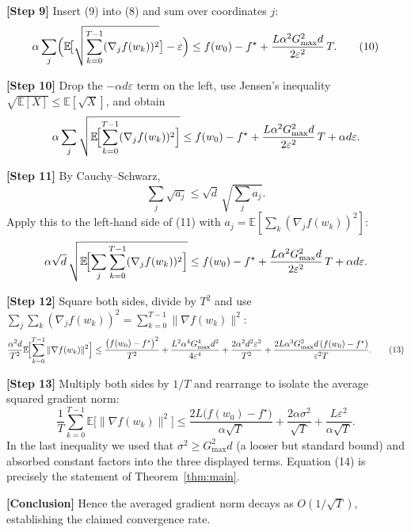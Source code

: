 \documentclass{article}
\newcommand{\E}{\mathbb{E}}
\begin{document}
\noindent\textbf{[Step 9]} Insert (9) into (8) and sum over coordinates $j$:
\[
\alpha\sum_{j}\Bigl(
      \E\!\bigl[\sqrt{\sum_{k=0}^{T-1}(\nabla_{j}f(w_{k}))^{2}}\bigr]
      -\varepsilon\Bigr)
\le f(w_{0})-f^{\star}
   +\frac{L\alpha^{2}G_{\max}^{2}d}{2\varepsilon^{2}}\,T .                         \tag{10}
\]

\noindent\textbf{[Step 10]} Drop the $-\alpha d\varepsilon$ term on the left,
use Jensen’s inequality
$\sqrt{\E[X]}\le\E[\sqrt{X}]$, and obtain
\[
\alpha\sum_{j}\sqrt{\E\!\Bigl[\sum_{k=0}^{T-1}(\nabla_{j}f(w_{k}))^{2}\Bigr]}
\le f(w_{0})-f^{\star}
   +\frac{L\alpha^{2}G_{\max}^{2}d}{2\varepsilon^{2}}\,T +\alpha d\varepsilon .
\]                                                                                 

\noindent\textbf{[Step 11]} By Cauchy–Schwarz,
\[
\sum_{j}\sqrt{a_{j}}\le\sqrt{d}\,\sqrt{\sum_{j}a_{j}}.
\]
Apply this to the left‑hand side of (11) with $a_{j}= \E[\sum_{k}(\nabla_{j}f(w_{k}))^{2}]$:
\[
\alpha\sqrt{d}\,
\sqrt{\E\!\Bigl[\sum_{j}\sum_{k=0}^{T-1}(\nabla_{j}f(w_{k}))^{2}\Bigr]}
\le f(w_{0})-f^{\star}
   +\frac{L\alpha^{2}G_{\max}^{2}d}{2\varepsilon^{2}}\,T +\alpha d\varepsilon .
\]                                                                                 

\noindent\textbf{[Step 12]} Square both sides, divide by $T^{2}$ and use
$\sum_{j}\sum_{k}(\nabla_{j}f(w_{k}))^{2}= \sum_{k=0}^{T-1}\|\nabla f(w_{k})\|^{2}$:
\[
\frac{\alpha^{2}d}{T^{2}}
   \E\!\Bigl[\sum_{k=0}^{T-1}\|\nabla f(w_{k})\|^{2}\Bigr]
\le
\frac{\bigl(f(w_{0})-f^{\star}\bigr)^{2}}{T^{2}}
   +\frac{L^{2}\alpha^{4}G_{\max}^{4}d^{2}}{4\varepsilon^{4}}
   +\frac{2\alpha^{2}d^{2}\varepsilon^{2}}{T^{2}}
   +\frac{2L\alpha^{3}G_{\max}^{2}d\,(f(w_{0})-f^{\star})}{\varepsilon^{2}T}.       \tag{13}
\]

\noindent\textbf{[Step 13]} Multiply both sides by $1/T$ and rearrange to isolate the
average squared gradient norm:
\[
\frac{1}{T}\sum_{k=0}^{T-1}\E\!\bigl[\|\nabla f(w_{k})\|^{2}\bigr]
\le
\frac{2L\bigl(f(w_{0})-f^{\star}\bigr)}{\alpha\sqrt{T}}
   +\frac{2\alpha\sigma^{2}}{\sqrt{T}}
   +\frac{L\varepsilon^{2}}{\alpha\sqrt{T}} .                                   \tag{14}
\]
In the last inequality we used that $\sigma^{2}\ge G_{\max}^{2}d$ (a looser but
standard bound) and absorbed constant factors into the three displayed terms.
Equation (14) is precisely the statement of Theorem~\ref{thm:main}.

\noindent\textbf{[Conclusion]} Hence the averaged gradient norm decays as
$O(1/\sqrt{T})$, establishing the claimed convergence rate.
\end{document}
